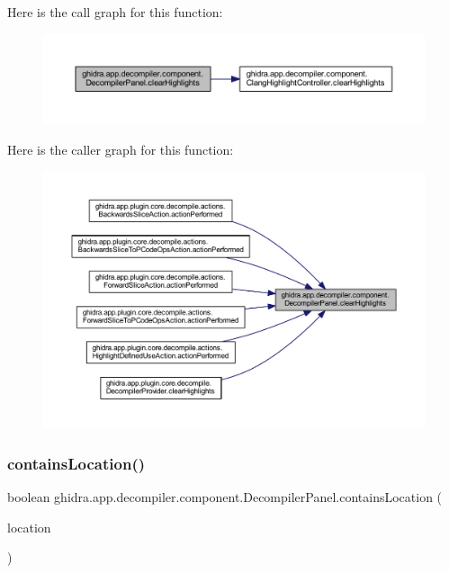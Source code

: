 Here is the call graph for this function\+:
\nopagebreak
\begin{figure}[H]
\begin{center}
\leavevmode
\includegraphics[width=350pt]{classghidra_1_1app_1_1decompiler_1_1component_1_1_decompiler_panel_a65e87140728b77057dd7defafccf293d_cgraph}
\end{center}
\end{figure}
Here is the caller graph for this function\+:
\nopagebreak
\begin{figure}[H]
\begin{center}
\leavevmode
\includegraphics[width=350pt]{classghidra_1_1app_1_1decompiler_1_1component_1_1_decompiler_panel_a65e87140728b77057dd7defafccf293d_icgraph}
\end{center}
\end{figure}
\mbox{\label{classghidra_1_1app_1_1decompiler_1_1component_1_1_decompiler_panel_abea619d9fb63b575bc784b16575dbd5b}} 
\subsubsection{\texorpdfstring{containsLocation()}{containsLocation()}}
{\footnotesize\ttfamily boolean ghidra.\+app.\+decompiler.\+component.\+Decompiler\+Panel.\+contains\+Location (\begin{DoxyParamCaption}\item[{Program\+Location}]{location }\end{DoxyParamCaption})\hspace{0.3cm}{\ttfamily [inline]}}



